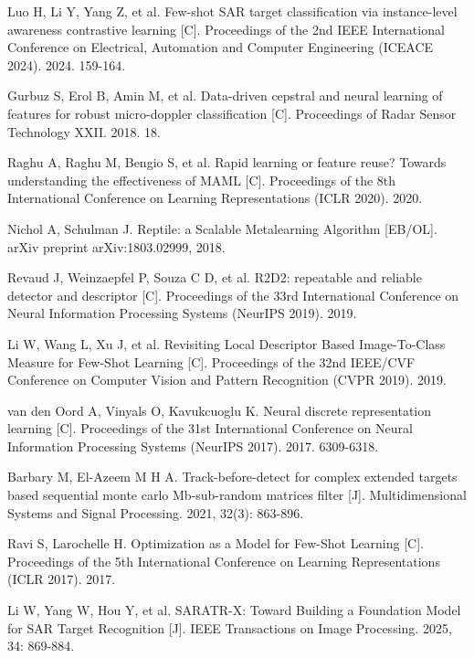 \documentclass[doctor,twoside,ttf]{nudtpaper}
\begin{document}
\begin{thebibliography}{99}
 Luo H, Li Y, Yang Z, et al. Few-shot SAR target classification via instance-level awareness contrastive learning [C]. Proceedings of the 2nd IEEE International Conference on Electrical, Automation and Computer Engineering (ICEACE 2024). 2024. 159-164.

 Gurbuz S, Erol B, Amin M, et al. Data-driven cepstral and neural learning of features for robust micro-doppler classification [C]. Proceedings of Radar Sensor Technology XXII. 2018. 18.

 Raghu A, Raghu M, Bengio S, et al. Rapid learning or feature reuse? Towards understanding the effectiveness of MAML [C]. Proceedings of the 8th International Conference on Learning Representations (ICLR 2020). 2020.

 Nichol A, Schulman J. Reptile: a Scalable Metalearning Algorithm [EB/OL]. arXiv preprint arXiv:1803.02999, 2018.

 Revaud J, Weinzaepfel P, Souza C D, et al. R2D2: repeatable and reliable detector and descriptor [C]. Proceedings of the 33rd International Conference on Neural Information Processing Systems (NeurIPS 2019). 2019.

 Li W, Wang L, Xu J, et al. Revisiting Local Descriptor Based Image-To-Class Measure for Few-Shot Learning [C]. Proceedings of the 32nd IEEE/CVF Conference on Computer Vision and Pattern Recognition (CVPR 2019). 2019.

 van den Oord A, Vinyals O, Kavukcuoglu K. Neural discrete representation learning [C]. Proceedings of the 31st International Conference on Neural Information Processing Systems (NeurIPS 2017). 2017. 6309-6318.

 Barbary M, El-Azeem M H A. Track-before-detect for complex extended targets based sequential monte carlo Mb-sub-random matrices filter [J]. Multidimensional Systems and Signal Processing. 2021, 32(3): 863-896.

 Ravi S, Larochelle H. Optimization as a Model for Few-Shot Learning [C]. Proceedings of the 5th International Conference on Learning Representations (ICLR 2017). 2017.

 Li W, Yang W, Hou Y, et al. SARATR-X: Toward Building a Foundation Model for SAR Target Recognition [J]. IEEE Transactions on Image Processing. 2025, 34: 869-884.


\end{thebibliography}
\end{document}
